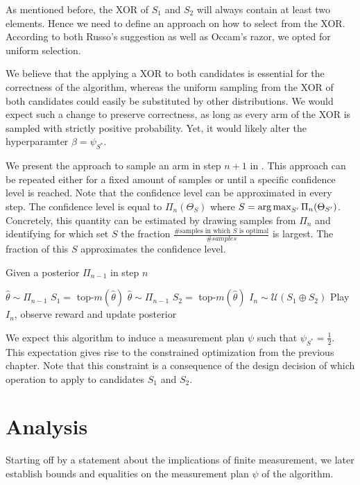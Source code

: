 As mentioned before, the XOR of $S_1$ and $S_2$ will always contain at least two
elements. Hence we need to define an approach on how to select from the XOR.
According to both Russo's suggestion as well as Occam's razor, we opted for
uniform selection.

We believe that the applying a XOR to both candidates is essential for the
correctness of the algorithm, whereas the uniform sampling from the XOR of both
candidates could easily be substituted by other distributions. We would expect
such a change to preserve correctness, as long as every arm of the XOR is
sampled with strictly positive probability. Yet, it would likely alter the
hyperparamter $\beta = \psi_{S^*}$.

We present the approach to sample an arm in step $n + 1$ in .
This approach can be repeated either for a fixed amount of samples or until a
specific confidence level is reached. Note that the confidence level can be
approximated in every step. The confidence level is equal to $\Pi_n(\Theta_S)$
where $S = \operatorname*{arg\,max}_{S'} \Pi_n(\Theta_{S'})$. Concretely, this quantity can be
estimated by drawing samples from $\Pi_n$ and identifying for which set $S$ the
fraction $\frac{\text{\# samples in which $S$ is optimal}}{\#samples}$ is
largest. The fraction of this $S$ approximates the confidence level.
\begin{algorithm}[H]
  \caption{Given a posterior $\Pi_{n-1}$ in step $n$}
  \label{alg:TXTS}
  \begin{algorithmic}
    \State $\hat{\theta} \sim \Pi_{n-1}$
    \State $S_1 =$ top-$m(\hat{\theta})$
    \Repeat
      \State $\hat{\theta} \sim \Pi_{n-1}$
      \State $S_2 = $ top-$m(\hat{\theta})$
    \State $I_n \sim \mathcal{U}(S_1 \oplus S_2)$
    \State Play $I_n$, observe reward and update posterior
  \end{algorithmic}
\end{algorithm}
We expect this algorithm to induce a measurement plan $\psi$ such that
$\psi_{S^*} = \frac{1}{2}$. This expectation gives rise to the constrained
optimization from the previous chapter. Note that this constraint is a
consequence of the design decision of which operation to apply to candidates
$S_1$ and $S_2$.

\section{Analysis}\label{section:analysis}
Starting off by a statement about the implications of finite measurement, we
later establish bounds and equalities on the measurement plan $\psi$ of the
algorithm.

